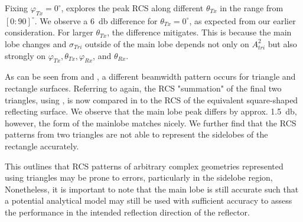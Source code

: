 Fixing $\varphi_{Tx}=0^\circ$,  explores the peak RCS along different $\theta_{Tx}$ in the range from $[0: 90]^\circ$. We observe a \SI{6}{\decibel} difference for $\theta_{Tx}=0^\circ$, as expected from our earlier consideration. For larger $\theta_{Tx}$, the difference mitigates. This is because the main lobe changes and $\sigma_{Tri}$ outside of the main lobe depends not only on $A_{tri}^2$ but also strongly on $\varphi_{Tx}, \theta_{Tx}, \varphi_{Rx}$, and $\theta_{Rx}$.

As can be seen from  and , a different beamwidth pattern occurs for triangle and rectangle surfaces. Referring to  again, the RCS "summation" of the final two triangles, using , is now compared in  to the RCS of the equivalent square-shaped reflecting surface. We observe that the main lobe peak differs by approx. \SI{1.5}{\decibel}, however, the form of the mainlobe matches nicely. We further find that the RCS patterns from two triangles are not able to represent the sidelobes of the rectangle accurately.

This outlines that RCS patterns of arbitrary complex geometries represented using triangles may be prone to errors, particularly in the sidelobe region, Nonetheless, it is important to note that the main lobe is still accurate such that a potential analytical model may still be used with sufficient accuracy to assess the performance in the intended reflection direction of the reflector.